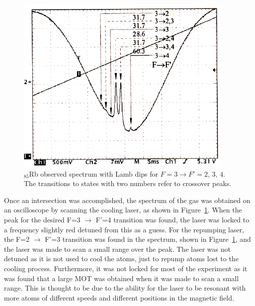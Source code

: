 \documentclass[twocolumn]{article}
\begin{document}
\begin{figure} [!h]
	\centering
	\includegraphics[width=0.95\linewidth]{Images/Peaks.png}
	\caption{$_{85}$Rb observed spectrum with Lamb dips for $F = 3 \rightarrow F' = 2, \, 3, \, 4$. The transitions to states with two numbers refer to crossover peaks.\cite{manual}}
	\label{fig:Peaks}
\end{figure}
\par Once an intersection was accomplished, the spectrum of the gas was obtained on an oscilloscope by scanning the cooling laser, as shown in Figure~\ref{fig:Peaks}. When the peak for the desired F=3 $\to$ F'=4 transition was found, the laser was locked to a frequency slightly red detuned from this as a guess. For the repumping laser, the F=2 $\to$ F'=3 transition was found in the spectrum, shown in Figure~\ref{fig:Peaks}, and the laser was made to scan a small range over the peak. The laser was not detuned as it is not used to cool the atoms, just to repump atoms lost to the cooling process. Furthermore, it was not locked for most of the experiment as it was found that a large MOT was obtained when it was made to scan a small range. This is thought to be due to the ability for the laser to be resonant with more atoms of different speeds and different positions in the magnetic field. 
\end{document}

